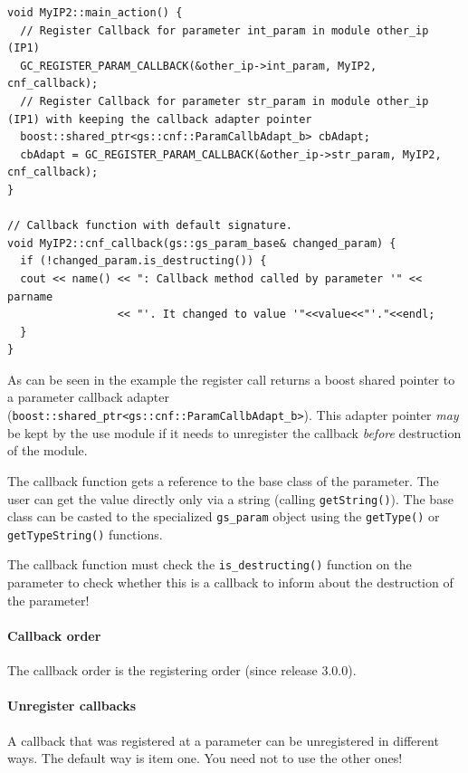 \begin{lstlisting}
void MyIP2::main_action() {
  // Register Callback for parameter int_param in module other_ip (IP1)
  GC_REGISTER_PARAM_CALLBACK(&other_ip->int_param, MyIP2, cnf_callback);
  // Register Callback for parameter str_param in module other_ip (IP1) with keeping the callback adapter pointer
  boost::shared_ptr<gs::cnf::ParamCallbAdapt_b> cbAdapt;
  cbAdapt = GC_REGISTER_PARAM_CALLBACK(&other_ip->str_param, MyIP2, cnf_callback);
}

// Callback function with default signature.
void MyIP2::cnf_callback(gs::gs_param_base& changed_param) {
  if (!changed_param.is_destructing()) {
  cout << name() << ": Callback method called by parameter '" << parname
                 << "'. It changed to value '"<<value<<"'."<<endl;
  }
}
\end{lstlisting}

As can be seen in the example the register call returns a boost shared pointer to a parameter callback adapter (\lstinline|boost::shared_ptr<gs::cnf::ParamCallbAdapt_b>|). This adapter pointer {\em may} be kept by the use module if it needs to unregister the callback {\em before} destruction of the module.

The callback function gets a reference to the base class of the parameter. The user can get the value directly only via a string (calling \lstinline|getString()|). The base class can be casted to the specialized \lstinline|gs_param| object using the \lstinline|getType()| or \lstinline|getTypeString()| functions.

The callback function must check the \lstinline|is_destructing()| function on the parameter to check whether this is a callback to inform about the destruction of the parameter!

\paragraph{Callback order} The callback order is the registering order (since \GreenControl release 3.0.0).

\paragraph{Unregister callbacks}   A callback that was registered at a parameter can be unregistered in different ways. The default way is item one. You need not to use the other ones!

